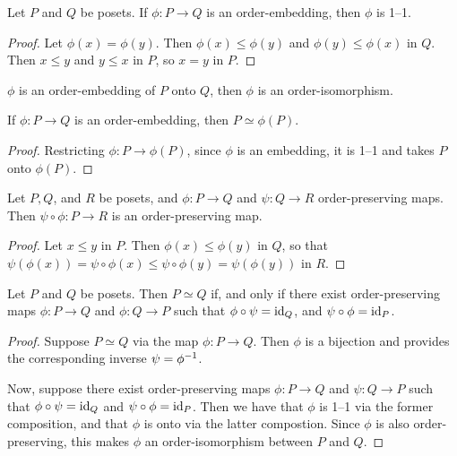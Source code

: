 \begin{lemma}\label{lemma_1.7.1}
  Let $P$ and $Q$ be posets. If $\phi:P \xrightarrow{} Q$ is an
  order-embedding, then $\phi$ is 1--1.
\end{lemma}
\begin{proof}
  Let $\phi(x)=\phi(y)$. Then $\phi(x) \leq \phi(y)$ and $\phi(y) \leq
  \phi(x)$ in $Q$. Then $x \leq y$ and $y \leq x$ in $P$, so $x=y$ in
   $P$.
\end{proof}
\begin{corollary}
  $\phi$ is an order-embedding of $P$ onto $Q$, then $\phi$ is an
  order-isomorphism.
\end{corollary}
\begin{corollary}
  If $\phi:P \xrightarrow{} Q$ is an order-embedding, then $P \simeq
  \phi(P)$.
\end{corollary}
\begin{proof}
  Restricting $\phi:P \xrightarrow{} \phi(P)$, since $\phi$ is an
  embedding, it is 1--1 and takes $P$ onto $\phi(P)$.
\end{proof}

\begin{proposition}\label{proposition_1.7.2}
  Let $P,Q$, and $R$ be posets, and $\phi:P \xrightarrow{} Q$ and
  $\psi:Q \xrightarrow{} R$ order-preserving maps. Then $\psi \circ
  \phi:P \xrightarrow{} R$ is an order-preserving map.
\end{proposition}
\begin{proof}
  Let $x \leq y$ in $P$. Then $\phi(x) \leq \phi(y)$ in $Q$, so that
  $\psi(\phi(x))=\psi \circ \phi(x) \leq \psi \circ
  \phi(y)=\psi(\phi(y))$ in $R$.
\end{proof}

\begin{proposition}\label{proposition_1.7.3}
  Let $P$ and $Q$ be posets. Then $P \simeq Q$ if, and only if there
  exist order-preserving maps $\phi:P \xrightarrow{} Q$ and $\phi:Q
  \xrightarrow{} P$ such that $\phi \circ \psi=\operatorname{id}_Q$, and $\psi \circ
  \phi=\operatorname{id}_P$.
\end{proposition}
\begin{proof}
  Suppose $P \simeq Q$ via the map  $\phi:P \xrightarrow{} Q$. Then
  $\phi$ is a bijection and provides the corresponding inverse
  $\psi=\phi^{-1}$.

  Now, suppose there exist order-preserving maps $\phi:P
  \xrightarrow{} Q$ and $\psi:Q \xrightarrow{} P$ such that $\phi
  \circ \psi=\operatorname{id}_Q$ and $\psi \circ \phi=\operatorname{id}_P$. Then we have that
  $\phi$ is 1--1 via the former composition, and that $\phi$ is onto
  via the latter compostion. Since $\phi$ is also order-preserving,
  this makes $\phi$ an order-isomorphism between $P$ and $Q$.
\end{proof}

